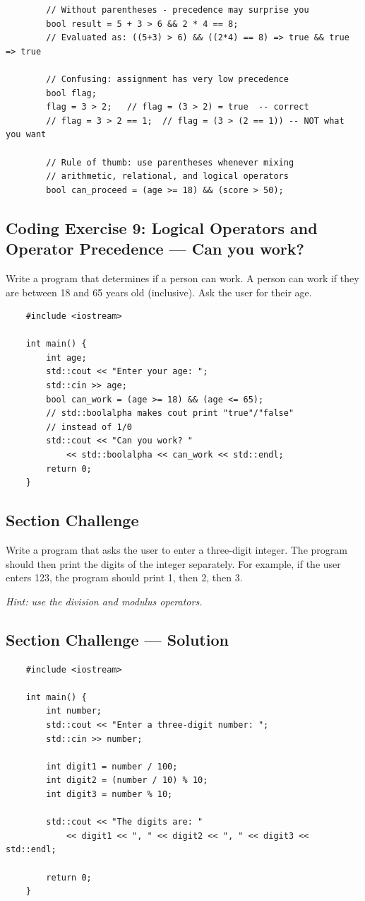 \begin{example}{\leavevmode}
	\begin{lstlisting}
		// Without parentheses - precedence may surprise you
		bool result = 5 + 3 > 6 && 2 * 4 == 8;
		// Evaluated as: ((5+3) > 6) && ((2*4) == 8) => true && true => true

		// Confusing: assignment has very low precedence
		bool flag;
		flag = 3 > 2;   // flag = (3 > 2) = true  -- correct
		// flag = 3 > 2 == 1;  // flag = (3 > (2 == 1)) -- NOT what you want

		// Rule of thumb: use parentheses whenever mixing
		// arithmetic, relational, and logical operators
		bool can_proceed = (age >= 18) && (score > 50);
	\end{lstlisting}
\end{example}

\subsection{Coding Exercise 9: Logical Operators and Operator Precedence --- Can you work?}
Write a program that determines if a person can work. A person can work if they are between 18 and 65 years old (inclusive). Ask the user for their age.
\begin{lstlisting}
	#include <iostream>

	int main() {
		int age;
		std::cout << "Enter your age: ";
		std::cin >> age;
		bool can_work = (age >= 18) && (age <= 65);
		// std::boolalpha makes cout print "true"/"false"
		// instead of 1/0
		std::cout << "Can you work? "
			<< std::boolalpha << can_work << std::endl;
		return 0;
	}
\end{lstlisting}

\subsection{Section Challenge}
Write a program that asks the user to enter a three-digit integer. The program should then print the digits of the integer separately. For example, if the user enters 123, the program should print 1, then 2, then 3.

\textit{Hint: use the division and modulus operators.}

\subsection{Section Challenge --- Solution}
\begin{lstlisting}
	#include <iostream>

	int main() {
		int number;
		std::cout << "Enter a three-digit number: ";
		std::cin >> number;

		int digit1 = number / 100;
		int digit2 = (number / 10) % 10;
		int digit3 = number % 10;

		std::cout << "The digits are: "
			<< digit1 << ", " << digit2 << ", " << digit3 << std::endl;

		return 0;
	}
\end{lstlisting}

